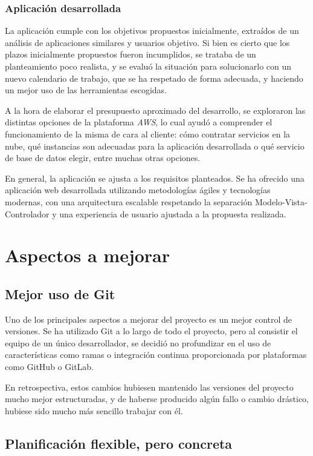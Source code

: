 \documentclass[10pt, a4paper]{aqademic}
\begin{document}
\subsubsection{Aplicación desarrollada}

La aplicación cumple con los objetivos propuestos inicialmente, extraídos de un análisis de aplicaciones similares y usuarios objetivo. Si bien es cierto que los plazos inicialmente propuestos fueron incumplidos, se trataba de un planteamiento poco realista, y se evaluó la situación para solucionarlo con un nuevo calendario de trabajo, que se ha respetado de forma adecuada, y haciendo un mejor uso de las herramientas escogidas.

A la hora de elaborar el presupuesto aproximado del desarrollo, se exploraron las distintas opciones de la plataforma \textit{AWS}, lo cual ayudó a comprender el funcionamiento de la misma de cara al cliente: cómo contratar servicios en la nube, qué instancias son adecuadas para la aplicación desarrollada o qué servicio de base de datos elegir, entre muchas otras opciones.

En general, la aplicación se ajusta a los requisitos planteados. Se ha ofrecido una aplicación web desarrollada utilizando metodologías ágiles y tecnologías modernas, con una arquitectura escalable respetando la separación Modelo-Vista-Controlador y una experiencia de usuario ajustada a la propuesta realizada.


\section{Aspectos a mejorar}

\subsection*{Mejor uso de Git}

Uno de los principales aspectos a mejorar del proyecto es un mejor control de versiones. Se ha utilizado Git a lo largo de todo el proyecto, pero al consistir el equipo de un único desarrollador, se decidió no profundizar en el uso de características como ramas o integración continua proporcionada por plataformas como GitHub o GitLab.

En retrospectiva, estos cambios hubiesen mantenido las versiones del proyecto mucho mejor estructuradas, y de haberse producido algún fallo o cambio drástico, hubiese sido mucho más sencillo trabajar con él.


\subsection*{Planificación flexible, pero concreta}
\end{document}
